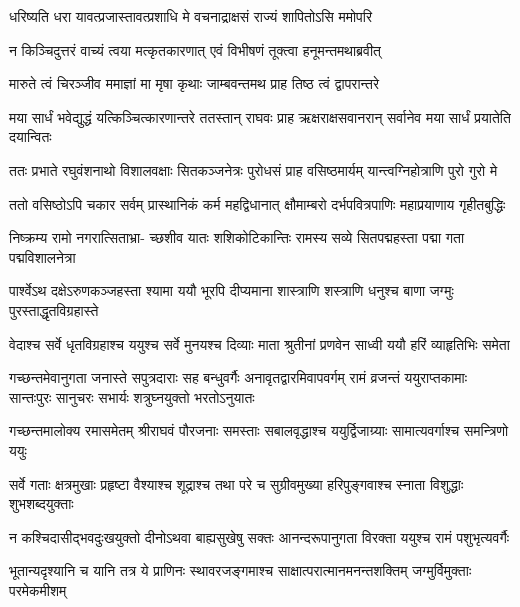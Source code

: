 \twolineshloka
{धरिष्यति धरा यावत्प्रजास्तावत्प्रशाधि मे}
{वचनाद्राक्षसं राज्यं शापितोऽसि ममोपरि} %

\twolineshloka
{न किञ्चिदुत्तरं वाच्यं त्वया मत्कृतकारणात्}
{एवं विभीषणं तूक्त्वा हनूमन्तमथाब्रवीत्} %

\twolineshloka
{मारुते त्वं चिरञ्जीव ममाज्ञां मा मृषा कृथाः}
{जाम्बवन्तमथ प्राह तिष्ठ त्वं द्वापरान्तरे} %

\threelineshloka
{मया सार्धं भवेद्युद्धं यत्किञ्चित्कारणान्तरे}
{ततस्तान् राघवः प्राह ऋक्षराक्षसवानरान्}
{सर्वानेव मया सार्धं प्रयातेति दयान्वितः} %

\fourlineindentedshloka
{ततः प्रभाते रघुवंशनाथो}
{विशालवक्षाः सितकञ्जनेत्रः}
{पुरोधसं प्राह वसिष्ठमार्यम्}
{यान्त्वग्निहोत्राणि पुरो गुरो मे} %

\fourlineindentedshloka
{ततो वसिष्ठोऽपि चकार सर्वम्}
{प्रास्थानिकं कर्म महद्विधानात्}
{क्षौमाम्बरो दर्भपवित्रपाणिः}
{महाप्रयाणाय गृहीतबुद्धिः} %

\fourlineindentedshloka
{निष्क्रम्य रामो नगरात्सिताभ्रा-}
{च्छशीव यातः शशिकोटिकान्तिः}
{रामस्य सव्ये सितपद्महस्ता}
{पद्मा गता पद्मविशालनेत्रा} %

\fourlineindentedshloka
{पार्श्वेऽथ दक्षेऽरुणकञ्जहस्ता}
{श्यामा ययौ भूरपि दीप्यमाना}
{शास्त्राणि शस्त्राणि धनुश्च बाणा}
{जग्मुः पुरस्ताद्धृतविग्रहास्ते} %

\fourlineindentedshloka
{वेदाश्च सर्वे धृतविग्रहाश्च}
{ययुश्च सर्वे मुनयश्च दिव्याः}
{माता श्रुतीनां प्रणवेन साध्वी}
{ययौ हरिं व्याहृतिभिः समेता} %

\fourlineindentedshloka
{गच्छन्तमेवानुगता जनास्ते}
{सपुत्रदाराः सह बन्धुवर्गैः}
{अनावृतद्वारमिवापवर्गम्}
{रामं व्रजन्तं ययुराप्तकामाः}
{सान्तःपुरः सानुचरः सभार्यः}
{शत्रुघ्नयुक्तो भरतोऽनुयातः} %

\fourlineindentedshloka
{गच्छन्तमालोक्य रमासमेतम्}
{श्रीराघवं पौरजनाः समस्ताः}
{सबालवृद्धाश्च ययुर्द्विजाग्र्याः}
{सामात्यवर्गाश्च समन्त्रिणो ययुः} %

\fourlineindentedshloka
{सर्वे गताः क्षत्रमुखाः प्रहृष्टा}
{वैश्याश्च शूद्राश्च तथा परे च}
{सुग्रीवमुख्या हरिपुङ्गवाश्च}
{स्नाता विशुद्धाः शुभशब्दयुक्ताः} %

\fourlineindentedshloka
{न कश्चिदासीद्भवदुःखयुक्तो}
{दीनोऽथवा बाह्यसुखेषु सक्तः}
{आनन्दरूपानुगता विरक्ता}
{ययुश्च रामं पशुभृत्यवर्गैः} %

\fourlineindentedshloka
{भूतान्यदृश्यानि च यानि तत्र}
{ये प्राणिनः स्थावरजङ्गमाश्च}
{साक्षात्परात्मानमनन्तशक्तिम्}
{जग्मुर्विमुक्ताः परमेकमीशम्} %

